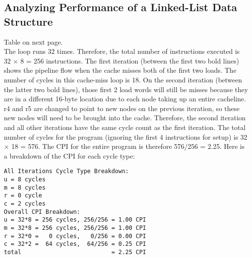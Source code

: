 \documentclass[10pt]{article}
\begin{document}
\subsection{Analyzing Performance of a Linked-List Data Structure}
Table on next page.\\
The loop runs 32 times. Therefore, the total number of instructions executed is 32 $\times$ 8 = 256 instructions. 
The first iteration (between the first two bold lines) shows the pipeline flow when the cache misses both of the first two loads. The number of cycles in this cache-miss loop is 18. On the second iteration (between the latter two bold lines), those first 2 load words will still be misses because they are in a different 16-byte location due to each node taking up an entire cacheline. r4 and r5 are changed to point to new nodes on the previous iteration, so these new nodes will need to be brought into the cache. Therefore, the second iteration and all other iterations have the same cycle count as the first iteration. The total number of cycles for the program (ignoring the first 4 instructions for setup) is 32 $\times$ 18 = 576. The CPI for the entire program is therefore 576/256 = 2.25.
Here is a breakdown of the CPI for each cycle type:\\
\begin{lstlisting}
All Iterations Cycle Type Breakdown:
u = 8 cycles
m = 8 cycles
r = 0 cycle
c = 2 cycles
Overall CPI Breakdown:
u = 32*8 = 256 cycles, 256/256 = 1.00 CPI
m = 32*8 = 256 cycles, 256/256 = 1.00 CPI
r = 32*0 =   0 cycles,   0/256 = 0.00 CPI
c = 32*2 =  64 cycles,  64/256 = 0.25 CPI
total                          = 2.25 CPI
\end{lstlisting}
\end{document}

